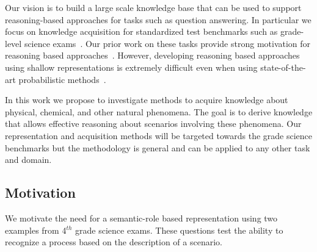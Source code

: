 Our vision is to build a large scale knowledge base that can be used to support reasoning-based approaches for tasks such as question answering. 
In particular we focus on knowledge acquisition for standardized test benchmarks such as grade-level science exams~\cite{clark2015elementary}.  Our prior work on these tasks provide strong motivation for reasoning based approaches~\cite{clark2014:akbc,chb2013:akbc}.
However, developing reasoning based approaches using shallow representations is extremely difficult even when using state-of-the-art probabilistic methods~\cite{khot2015:emlnlp}. 

In this work we propose to investigate methods to acquire knowledge about physical, chemical, and other natural phenomena.
The goal is to derive knowledge that allows effective reasoning about scenarios involving these phenomena. 
Our representation and acquisition methods will be targeted towards the grade science benchmarks but the methodology is general and can be applied to any other task and domain.

\subsection{Motivation}
We motivate the need for a semantic-role based representation using two examples from 4$^{th}$ grade science exams. These questions test the ability to recognize a process based on the description of a scenario. \\
\begin{center}
\\
\end{center}

